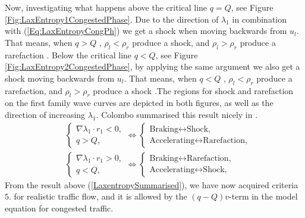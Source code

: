 \documentclass[10pt]{article}
\numberwithin{equation}{section}
\begin{document}
Now, investigating what happens above the critical line $ q = Q$, see Figure \ref{Fig:LaxEntropy1CongestedPhase}. Due to the direction of $\lambda_1$ in combination with (\ref{Eq:LaxEntropyCongPh}) we get a shock when moving backwards from $u_l$. That means, when $q > Q$ , $\rho_l < \rho_r$ produce a shock, and $\rho_l > \rho_r$ produce a rarefaction . Below the critical line $q < Q$, see Figure \ref{Fig:LaxEntropy2CongestedPhase}, by applying the same argument we also get a shock moving backwards from $u_l$. That means, when $q < Q$ , $\rho_l < \rho_r$ produce a rarefaction, and $\rho_l > \rho_r$ produce a shock .The regions for shock and rarefaction on the first family wave curves are depicted in both figures, as well as the direction of increasing $\lambda_1$. Colombo summarised this result nicely in \cite{Colombo2002}.
\begin{equation}
\begin{aligned}
   & \begin{cases}
    \nabla \lambda_1 \cdot r_1 < 0 , \\
    q > Q ,
    \end{cases} \iff \begin{cases}
    \text{Braking} \leftrightarrow \text{Shock,} \\
    \text{Accelerating} \leftrightarrow \text{Rarefaction,} 
    \end{cases}  \\
   &\begin{cases}
    \nabla \lambda_1 \cdot r_1 > 0 , \\
    q < Q ,
    \end{cases} \iff \begin{cases}
    \text{Braking} \leftrightarrow \text{Rarefaction,} \\
    \text{Accelerating} \leftrightarrow \text{Shock,} 
    \end{cases}
    \label{LaxentropySummarised}
\end{aligned} \end{equation} From the result above (\ref{LaxentropySummarised}), we have now acquired criteria $5.$ for realistic traffic flow, and it is allowed by the $(q-Q)v$-term in the model equation for congested traffic. 
\end{document}
